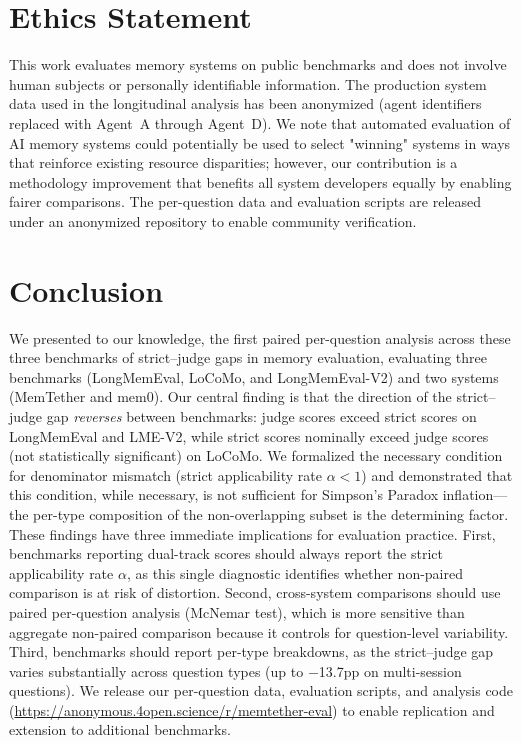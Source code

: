 \documentclass{article}
\begin{document}
\section{Ethics Statement}
This work evaluates memory systems on public benchmarks and does not involve human subjects or personally identifiable information. The production system data used in the longitudinal analysis has been anonymized (agent identifiers replaced with Agent~A through Agent~D). We note that automated evaluation of AI memory systems could potentially be used to select "winning" systems in ways that reinforce existing resource disparities; however, our contribution is a methodology improvement that benefits all system developers equally by enabling fairer comparisons. The per-question data and evaluation scripts are released under an anonymized repository to enable community verification.
\section{Conclusion}
We presented to our knowledge, the first paired per-question analysis across these three benchmarks of strict--judge gaps in memory evaluation, evaluating three benchmarks (LongMemEval, LoCoMo, and LongMemEval-V2) and two systems (MemTether and mem0). Our central finding is that the direction of the strict--judge gap \emph{reverses} between benchmarks: judge scores exceed strict scores on LongMemEval and LME-V2, while strict scores nominally exceed judge scores (not statistically significant) on LoCoMo. We formalized the necessary condition for denominator mismatch (strict applicability rate $\alpha < 1$) and demonstrated that this condition, while necessary, is not sufficient for Simpson's Paradox inflation---the per-type composition of the non-overlapping subset is the determining factor. These findings have three immediate implications for evaluation practice. First, benchmarks reporting dual-track scores should always report the strict applicability rate $\alpha$, as this single diagnostic identifies whether non-paired comparison is at risk of distortion. Second, cross-system comparisons should use paired per-question analysis (McNemar test), which is more sensitive than aggregate non-paired comparison because it controls for question-level variability. Third, benchmarks should report per-type breakdowns, as the strict--judge gap varies substantially across question types (up to $-$13.7pp on multi-session questions). We release our per-question data, evaluation scripts, and analysis code (\url{https://anonymous.4open.science/r/memtether-eval}) to enable replication and extension to additional benchmarks.
\end{document}
